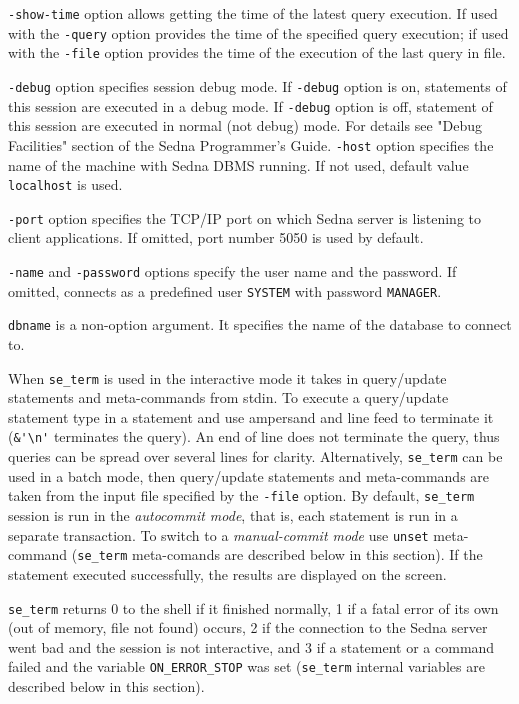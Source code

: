 \documentclass[a4paper,12pt]{article}
\begin{document}
\verb!-show-time! option allows getting the time of the latest query execution. If used with the \verb!-query! option provides the time of the specified query execution; if used with the \verb!-file! option provides the time of the execution of the last query in file.

\verb!-debug! option specifies session debug mode. If \verb!-debug! option is on, statements of this session are executed in a debug mode. If \verb!-debug! option is off, statement of this session are executed in normal (not debug) mode. For details see "Debug Facilities" section of the Sedna Programmer's Guide.
\verb!-host! option specifies the name of the machine with Sedna DBMS running. If not used, default value \verb!localhost! is used.

\verb!-port! option specifies the TCP/IP port on which Sedna server is listening to client applications. If omitted, port number 5050 is used by default.

\verb!-name! and \verb!-password! options specify the user name and the password. If omitted, connects as a predefined user \verb!SYSTEM! with password \verb!MANAGER!.

\verb!dbname! is a non-option argument. It specifies the name of the database to connect to.

When \verb!se_term! is used in the interactive mode it takes in query/update statements and meta-commands from stdin. To execute a query/update statement type in a statement and use ampersand and line feed to terminate it (\verb!&'\n'! terminates the query). An end of line does not terminate the query, thus queries can be spread over several lines for clarity. Alternatively, \verb!se_term! can be used in a batch mode, then query/update statements and meta-commands are taken from the input file specified by the \verb!-file! option. By default, \verb!se_term! session is run in the \emph{autocommit mode}, that is, each statement is run in a separate transaction. To switch to a \emph{manual-commit mode} use \verb!unset! meta-command (\verb!se_term! meta-comands are described below in this section). If the statement executed successfully, the results are displayed on the screen.

\verb!se_term! returns 0 to the shell if it finished normally, 1 if a fatal error of its own (out of memory, file not
found) occurs, 2 if the connection to the Sedna server went bad and the session is not interactive, and 3 if
a statement or a command failed and the variable \verb!ON_ERROR_STOP! was set (\verb!se_term! internal variables are described below in this section).
\end{document}
